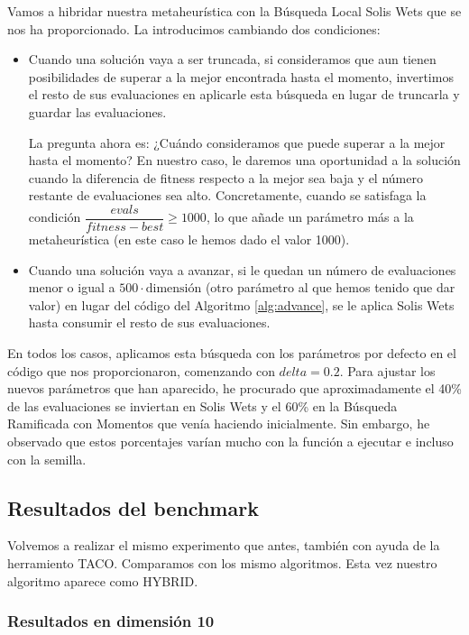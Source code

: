 \documentclass{article}
\begin{document}
Vamos a hibridar nuestra metaheurística con la Búsqueda Local Solis Wets que se nos ha proporcionado. La introducimos cambiando
dos condiciones:
\begin{itemize}
	\item Cuando una solución vaya a ser truncada, si consideramos que aun tienen posibilidades de superar a la mejor encontrada hasta
	el momento, invertimos el resto de sus evaluaciones en aplicarle esta búsqueda en lugar de truncarla y guardar las evaluaciones.
	
	La pregunta ahora es: ¿Cuándo consideramos que puede superar a la mejor hasta el momento? En nuestro caso, le daremos una oportunidad
	a la solución cuando la diferencia de fitness respecto a la mejor sea baja y el número restante de evaluaciones sea alto. Concretamente,
	cuando se satisfaga la condición $\dfrac{evals}{fitness-best}\geq 1000$, lo que añade un parámetro más a la metaheurística (en este
	caso le hemos dado el valor 1000).
	
	\item Cuando una solución vaya a avanzar, si le quedan un número de evaluaciones menor o igual a $500\cdot\text{dimensión}$ (otro
	parámetro al que hemos tenido que dar valor) en lugar del código del Algoritmo \ref{alg:advance}, se le aplica Solis Wets
	hasta consumir el resto de sus evaluaciones.
\end{itemize}

En todos los casos, aplicamos esta búsqueda con los parámetros por defecto en el código que nos proporcionaron, comenzando con $delta=0.2$.
Para ajustar los nuevos parámetros que han aparecido, he procurado que aproximadamente el 40\% de las evaluaciones se inviertan en
Solis Wets y el 60\% en la Búsqueda Ramificada con Momentos que venía haciendo inicialmente. Sin embargo, he observado que estos
porcentajes varían mucho con la función a ejecutar e incluso con la semilla.

\subsection{Resultados del benchmark}

Volvemos a realizar el mismo experimento que antes, también con ayuda de la herramiento TACO. Comparamos con los mismo algoritmos.
Esta vez nuestro algoritmo aparece como HYBRID.

\subsubsection*{Resultados en dimensión 10}
\end{document}
